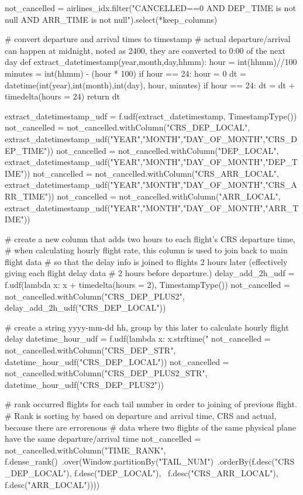 \documentclass[11pt]{article}
\begin{document}
not_cancelled = airlines_idx.filter("CANCELLED==0 AND DEP_TIME is not null AND ARR_TIME is not null").select(*keep_columns)

# convert departure and arrival times to timestamp
# actual departure/arrival can happen at midnight, noted as 2400, they are converted to 0:00 of the next day
def extract_datetimestamp(year,month,day,hhmm):
  hour = int(hhmm)//100
  minutes = int(hhmm) - (hour * 100)
  if hour == 24:
      hour = 0
  dt = datetime(int(year),int(month),int(day), hour, minutes)
  if hour == 24:
      dt = dt + timedelta(hours = 24)
  return dt

extract_datetimestamp_udf = f.udf(extract_datetimestamp, TimestampType())
not_cancelled = not_cancelled.withColumn("CRS_DEP_LOCAL", extract_datetimestamp_udf("YEAR","MONTH","DAY_OF_MONTH","CRS_DEP_TIME"))
not_cancelled = not_cancelled.withColumn("DEP_LOCAL", extract_datetimestamp_udf("YEAR","MONTH","DAY_OF_MONTH","DEP_TIME"))
not_cancelled = not_cancelled.withColumn("CRS_ARR_LOCAL", extract_datetimestamp_udf("YEAR","MONTH","DAY_OF_MONTH","CRS_ARR_TIME"))
not_cancelled = not_cancelled.withColumn("ARR_LOCAL", extract_datetimestamp_udf("YEAR","MONTH","DAY_OF_MONTH","ARR_TIME"))

# create a new column that adds two hours to each flight's CRS departure time, 
# when calculating hourly flight rate, this column is used to join back to main flight data
# so that the delay info is joined to flights 2 hours later (effectively giving each flight delay data
# 2 hours before departure.)
delay_add_2h_udf = f.udf(lambda x: x + timedelta(hours = 2), TimestampType())
not_cancelled = not_cancelled.withColumn("CRS_DEP_PLUS2", delay_add_2h_udf("CRS_DEP_LOCAL"))

# create a string yyyy-mm-dd hh, group by this later to calculate hourly flight delay
datetime_hour_udf = f.udf(lambda x: x.strftime("%
not_cancelled = not_cancelled.withColumn("CRS_DEP_STR", datetime_hour_udf("CRS_DEP_LOCAL"))
not_cancelled = not_cancelled.withColumn("CRS_DEP_PLUS2_STR", datetime_hour_udf("CRS_DEP_PLUS2"))

# rank occurred flights for each tail number in order to joining of previous flight. 
# Rank is sorting by based on departure and arrival time, CRS and actual, because there are errorenous 
# data where two flights of the same physical plane have the same departure/arrival time
not_cancelled = not_cancelled.withColumn("TIME_RANK", f.dense_rank()\
                .over(Window.partitionBy("TAIL_NUM")\
                .orderBy(f.desc("CRS_DEP_LOCAL"), f.desc("DEP_LOCAL"), \
                 f.desc("CRS_ARR_LOCAL"), f.desc("ARR_LOCAL"))))
\end{document}
